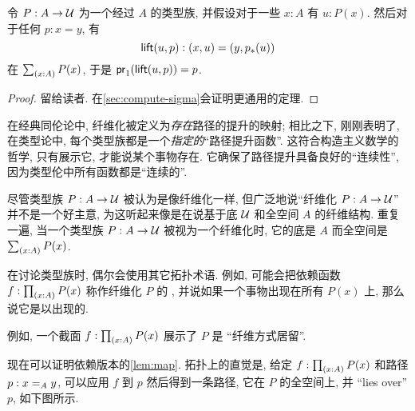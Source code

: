\begin{lem}[路径提升性质]
    \label{thm:path-lifting}
    令 $P:A\to\type$ 为一个经过 $A$ 的类型族, 并假设对于一些 $x:A$ 有 $u:P(x)$.
    然后对于任何 $p:x=y$, 有
    \begin{equation*}
        \mathsf{lift}(u,p):(x,u)=(y,\trans{p}{u})
    \end{equation*}
    在 $\sm{x:A}P(x)$, 于是 $\ap{\proj1}{\mathsf{lift}(u,p)} = p$.
\end{lem}
\begin{proof}
    留给读者.
    在\cref{sec:compute-sigma}会证明更通用的定理.
\end{proof}

在经典同伦论中, 纤维化被定义为\emph{存在}路径的提升的映射;
相比之下, 刚刚表明了, 在类型论中, 每个类型族都是一个\emph{指定的}``路径提升函数''.
这符合构造主义数学的哲学, 只有展示它, 才能说某个事物存在.
%
它确保了路径提升具备良好的``连续性'', 因为类型伦中所有函数都是``连续的''.

\begin{rmk}
    尽管类型族 $P:A\to \type$ 被认为是像纤维化一样, 但广泛地说``纤维化 $P:A\to\type$'' 并不是一个好主意, 为这听起来像是在说基于底 $\type$ 和全空间 $A$ 的纤维结构.
    重复一遍, 当一个类型族 $P:A\to \type$ 被视为一个纤维化时, 它的底是 $A$ 而全空间是 $\sm{x:A} P(x)$.

    在讨论类型族时, 偶尔会使用其它拓扑术语.
    例如, 可能会把依赖函数 $f:\prd{x:A} P(x)$ 称作纤维化 $P$ 的
    , 并说如果一个事物出现在所有 $P(x)$ 上, 那么说它是以出现的.

    例如, 一个截面 $f:\prd{x:A} P(x)$ 展示了 $P$ 是 ``纤维方式居留''.
\end{rmk}

现在可以证明依赖版本的\cref{lem:map}.
拓扑上的直觉是, 给定 $f:\prd{x:A} P(x)$ 和路径 $p:\id[A]xy$, 可以应用 $f$ 到 $p$ 然后得到一条路径, 它在 $P$ 的全空间上, 并 ``lies over'' $p$, 如下图所示.

\begin{center}
\end{center}

